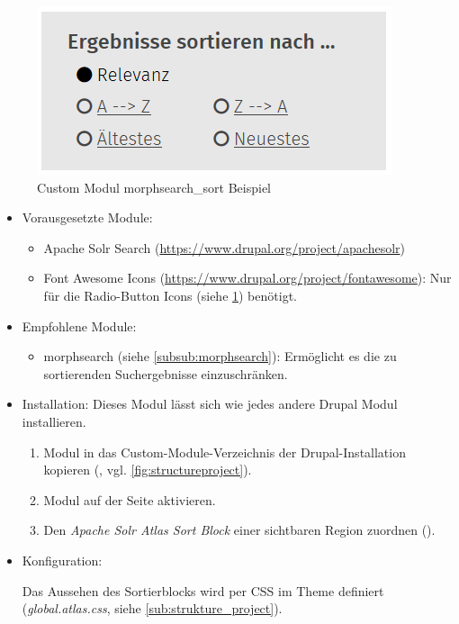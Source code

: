 \begin{figure}[H]
	\centering
	\includegraphics[height=0.10\textheight]{images/example_morphsearchsort}
	\caption{Custom Modul morphsearch\_sort Beispiel}
	\label{fig:example_morphsearchsort}
\end{figure}

\begin{itemize}[parsep=0pt, itemsep=5.0pt plus 2.0pt minus 1.0pt, leftmargin=*]
	\item Vorausgesetzte Module:

	\begin{itemize}
		\item Apache Solr Search (\url{https://www.drupal.org/project/apachesolr})

		\item Font Awesome Icons (\url{https://www.drupal.org/project/fontawesome}): Nur für die Radio-Button Icons (siehe \cref{fig:example_morphsearchsort}) benötigt.
	\end{itemize}


	\item Empfohlene Module:

	\begin{itemize}
		\item morphsearch (siehe \cref{subsub:morphsearch}): Ermöglicht es die zu sortierenden Suchergebnisse einzuschränken.
	\end{itemize}


	\item Installation: Dieses Modul lässt sich wie jedes andere Drupal Modul installieren.
	\begin{enumerate}
		\item Modul in das Custom-Module-Verzeichnis der Drupal-Installation kopieren  (\zB {}, vgl. \cref{fig:structureproject}).
		\item Modul auf der Seite  aktivieren.
		\item Den \textit{Apache Solr Atlas Sort Block} einer sichtbaren Region zuordnen ().
	\end{enumerate}

	\item Konfiguration:

	\noconfig

	Das Aussehen des Sortierblocks wird per CSS im Theme definiert (\zB \textit{global.atlas.css}, siehe \cref{sub:strukture_project}).

\end{itemize}


